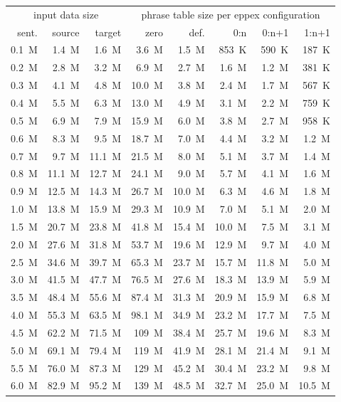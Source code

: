 \begin{table}[!htb]
\centering
\def\arraystretch{1.1}
\begin{tabular}{ | r  r  r | r  r  r  r  r | }
\hline
\multicolumn{3}{|c|}{input data size} & \multicolumn{5}{|c|}{phrase table size per eppex configuration} \\
sent. & source & target & zero & def. & 0:n & 0:n+1 & 1:n+1 \\
\hline
\hline
0.1~M & 1.4~M & 1.6~M & 3.6~M & 1.5~M & 853~K & 590~K & 187~K \\
0.2~M & 2.8~M & 3.2~M & 6.9~M & 2.7~M & 1.6~M & 1.2~M & 381~K \\
0.3~M & 4.1~M & 4.8~M & 10.0~M & 3.8~M & 2.4~M & 1.7~M & 567~K \\
0.4~M & 5.5~M & 6.3~M & 13.0~M & 4.9~M & 3.1~M & 2.2~M & 759~K \\
0.5~M & 6.9~M & 7.9~M & 15.9~M & 6.0~M & 3.8~M & 2.7~M & 958~K \\
0.6~M & 8.3~M & 9.5~M & 18.7~M & 7.0~M & 4.4~M & 3.2~M & 1.2~M \\
0.7~M & 9.7~M & 11.1~M & 21.5~M & 8.0~M & 5.1~M & 3.7~M & 1.4~M \\
0.8~M & 11.1~M & 12.7~M & 24.1~M & 9.0~M & 5.7~M & 4.1~M & 1.6~M \\
0.9~M & 12.5~M & 14.3~M & 26.7~M & 10.0~M & 6.3~M & 4.6~M & 1.8~M \\
1.0~M & 13.8~M & 15.9~M & 29.3~M & 10.9~M & 7.0~M & 5.1~M & 2.0~M \\
1.5~M & 20.7~M & 23.8~M & 41.8~M & 15.4~M & 10.0~M & 7.5~M & 3.1~M \\
2.0~M & 27.6~M & 31.8~M & 53.7~M & 19.6~M & 12.9~M & 9.7~M & 4.0~M \\
2.5~M & 34.6~M & 39.7~M & 65.3~M & 23.7~M & 15.7~M & 11.8~M & 5.0~M \\
3.0~M & 41.5~M & 47.7~M & 76.5~M & 27.6~M & 18.3~M & 13.9~M & 5.9~M \\
3.5~M & 48.4~M & 55.6~M & 87.4~M & 31.3~M & 20.9~M & 15.9~M & 6.8~M \\
4.0~M & 55.3~M & 63.5~M & 98.1~M & 34.9~M & 23.2~M & 17.7~M & 7.5~M \\
4.5~M & 62.2~M & 71.5~M & 109~M & 38.4~M & 25.7~M & 19.6~M & 8.3~M \\
5.0~M & 69.1~M & 79.4~M & 119~M & 41.9~M & 28.1~M & 21.4~M & 9.1~M \\
5.5~M & 76.0~M & 87.3~M & 129~M & 45.2~M & 30.4~M & 23.2~M & 9.8~M \\
6.0~M & 82.9~M & 95.2~M & 139~M & 48.5~M & 32.7~M & 25.0~M & 10.5~M \\

\end{tabular}
\end{table}
